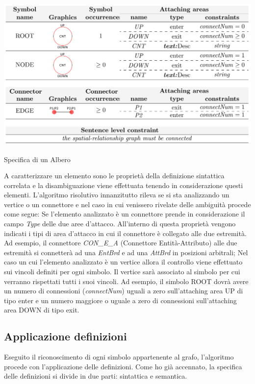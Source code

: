             \begin{table}[htbp]
                \centering
                \includegraphics[scale=0.4]{Figure/final_syntax_definition_tree.PNG}
                \caption{Specifica di un Albero}
                \label{tab:final_syntax_definition_tree}
            \end{table}

            A caratterizzare un elemento sono le proprietà della definizione sintattica correlata e la disambiguazione viene effettuata tenendo in considerazione questi elementi.
            \newline
            L'algoritmo risolutivo innanzitutto rileva se si sta analizzando un vertice o un connettore e nel caso in cui venissero rivelate delle ambiguità procede come segue: Se l'elemento analizzato è un connettore prende in considerazione il campo \textit{Type} delle due aree d'attacco. All'interno di questa proprietà vengono indicati i tipi di area d'attacco in cui il connettore è collegato alle due estremità. Ad esempio, il connettore \textit{CON\_E\_A} (Connettore Entità-Attributo) alle due estremità si connetterà ad una \textit{EntBrd} e ad una \textit{AttBrd} in posizioni arbitrali; Nel caso un cui l'elemento analizzato è un vertice allora il controllo viene effettuato sui vincoli definiti per ogni simbolo. Il vertice sarà associato al simbolo per cui verranno rispettati tutti i suoi vincoli. Ad esempio, il simbolo ROOT dovrà avere un numero di connessioni (\textit{connectNum}) uguali a zero sull'attaching area UP di tipo enter e un numero maggiore o uguale a zero di connessioni sull'attaching area DOWN di tipo exit.
            \newline

        \subsection{Applicazione definizioni}
            Eseguito il riconoscimento di ogni simbolo appartenente al grafo, l'algoritmo procede con l'applicazione delle definizioni. Come ho già accennato, la specifica delle definizioni si divide in due parti: sintattica e semantica.

